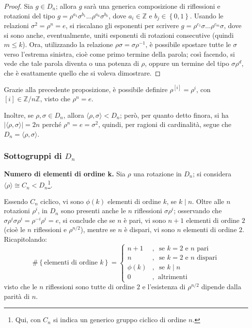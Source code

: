 \documentclass[11pt]{article}
\theoremstyle{style}
\numberwithin{equation}{subsection}
\renewcommand{\textbf}[1]{\textsf{\bfseries #1}}
\begin{document}
	\begin{proof}
	Sia $g \in D_n$; allora $g$ sar\`a una generica composizione di riflessioni e rotazioni del tipo $g= \rho ^{a_1} \sigma ^{b_1} \ldots \rho ^{a_k} \sigma ^{b_k} $, dove $a_i \in \mathbb{Z}$ e $b_j \in \left\{ 0,1 \right\} $. 
	Usando le relazioni $\sigma ^2 = \rho ^n = e$, si riscalano gli esponenti per scrivere $g = \rho ^{c_1} \sigma \ldots \rho ^{c_m} \sigma $, dove si sono anche, eventualmente, uniti esponenti di rotazioni consecutive (quindi $m\le k$).
	Ora, utilizzando la relazione $\rho \sigma =\sigma \rho ^{-1}$, \`e possibile spostare tutte le $\sigma$ verso l'estrema sinistra, cio\`e come primo termine della parola; cos\`i facendo, si vede che tale parola diventa o una potenza di $\rho $, oppure un termine del tipo $\sigma \rho ^d$, che \`e esattamente quello che si voleva dimostrare.
			\end{proof}
\noindent Grazie alla precedente proposizione, \`e possibile definire $\rho ^{[i]} = \rho ^i$, con $[i] \in \mathbb{Z} / n\mathbb{Z}$, visto che $\rho ^n = e$.

Inoltre, se $\rho ,\sigma  \in D_n$, allora $\langle \rho ,\sigma  \rangle< D_n$; per\`o, per quanto detto finora, si ha $\lvert \langle \rho ,\sigma  \rangle \rvert = 2n$ perch\'e $\rho ^n = e= \sigma ^2 $, quindi, per ragioni di cardinalit\`a, segue che $D_n = \langle \rho ,\sigma  \rangle$.

\subsubsection{Sottogruppi di $D_n$}
\hfill

\textbf{Numero di elementi di ordine k.} 
Sia $\rho $ una rotazione in $D_n$; si considera $\langle \rho  \rangle\cong C_n < D_n$\footnote{Qui, con $C_n$ si indica un generico gruppo ciclico di ordine $n$.}.

Essendo $C_n$ ciclico, vi sono $\phi (k)$ elementi di ordine $k$, se $k  \mid  n$.
Oltre alle $n$ rotazioni $\rho ^i$, in $D_n$ sono presenti anche le $n$ riflessioni $\sigma \rho ^i$; osservando che $\sigma \rho ^i \sigma \rho ^i = \rho ^{-i}\rho ^{i} = e $, si conclude che se $n$ \`e pari, vi sono $n+1$ elementi di ordine $2$ (cio\`e le $n$ riflessioni e $\rho ^{n / 2} $), mentre se $n$ \`e dispari, vi sono $n$ elementi di ordine $2$.
Ricapitolando:
\begin{equation}
\# \left\{ \text{elementi di ordine } k \right\} = \begin{cases}
	n + 1 &,\ \text{ se } k=2 \text{ e } n \text{ pari}\\
	n  &,\  \text{ se }k=2 \text{ e } n \text{ dispari}\\
	\phi (k)&,\ \text{ se } k \mid n\\
	0 &,\ \text{ altrimenti }
\end{cases}
\end{equation}
visto che le $n$ riflessioni sono tutte di ordine $2$ e l'esistenza di $\rho ^{n / 2} $ dipende dalla parit\`a di $n$.
\vspace*{5pt}
\end{document}
